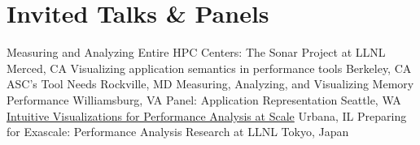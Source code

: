 \section{Invited Talks \& Panels}
\iftoggle{grant}{
}{
	\cventry{June 2, 2017}{4th International Workshop on Reproducibility in Parallel Computing (REPPAR'17)}
		{\newline Spack and Reproducibility in HPC}
		{Orlando, FL}{}{Held at the International Parallel and Distributed Processing Sympsium (IPDPS'17)}
	\cventry{February 26, 2016}{Tokyo Institute of Technology}
		{\newline Measuring and Analyzing Entire HPC Centers: The Sonar Project at LLNL}
		{Tokyo, Japan}{}{}
    }
		{\newline Measuring and Analyzing Entire HPC Centers: The Sonar Project at LLNL}
		{Merced, CA}{}{}
		{\newline Visualizing application semantics in performance tools}
		{Berkeley, CA}{}{}
		{\newline ASC's Tool Needs}
		{Rockville, MD}
		{}{}
		{\newline Measuring, Analyzing, and Visualizing Memory Performance}
		{Williamsburg, VA}
		{}{}
		{\newline Panel: Application Representation}
		{Seattle, WA}
		{}{}
		{\href{https://www.youtube.com/watch?v=8rJ4231hq9g}
		{\newline Intuitive Visualizations for Performance Analysis at Scale}}
		{Urbana, IL}
		{}{}%
		{\newline Preparing for Exascale: Performance Analysis Research at LLNL}
		{Tokyo, Japan}{}{}
